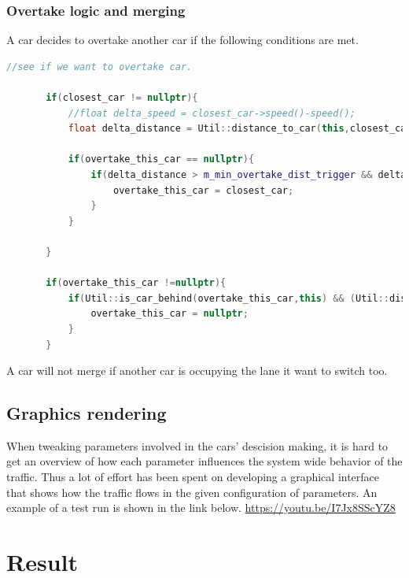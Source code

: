 \documentclass{article}
\begin{document}
    \subsubsection{Overtake logic and merging}
      A car decides to overtake another car if the following conditions are met.
      \begin{lstlisting}[language=C++]
          //see if we want to overtake car.

       if(closest_car != nullptr){
           //float delta_speed = closest_car->speed()-speed();
           float delta_distance = Util::distance_to_car(this,closest_car);

           if(overtake_this_car == nullptr){
               if(delta_distance > m_min_overtake_dist_trigger && delta_distance < m_max_overtake_dist_trigger && (target_speed()/closest_car->target_speed() > m_aggressiveness*1.0f ) && current_lane == 0 && closest_car->current_node->get_parent_segment()->get_lane_number(closest_car->current_node) == 0){
                   overtake_this_car = closest_car;
               }
           }

       }

       if(overtake_this_car !=nullptr){
           if(Util::is_car_behind(overtake_this_car,this) && (Util::distance_to_car(this,overtake_this_car) > m_overtake_done_dist)){
               overtake_this_car = nullptr;
           }
       }
      \end{lstlisting}
      A car will not merge if another car is occupying the lane it want to switch too.
  \subsection{Graphics rendering}
    When tweaking parameters involved in the cars' descision making, it is hard to
    get an overview of how each parameter influences the system wide behavior of the
    traffic. Thus a lot of effort has been spent on developing a graphical interface
    that shows how the traffic flows in the given configuration of parameters.
    An example of a test run is shown in the link below.
    \url{https://youtu.be/I7Jx8SScYZ8}

\section{Result}
\end{document}
